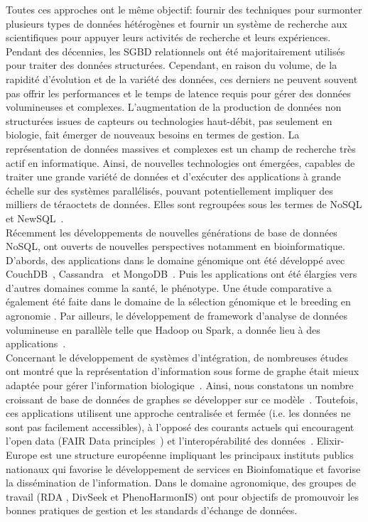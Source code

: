 Toutes ces approches ont le même objectif: fournir des techniques pour surmonter plusieurs types de données hétérogènes et fournir un système de recherche aux scientifiques pour appuyer leurs activités de recherche et leurs expériences.
Pendant des décennies, les SGBD relationnels ont été majoritairement utilisés pour traiter des données structurées. Cependant, en raison du volume, de la rapidité d'évolution et de la variété des données, ces derniers ne peuvent souvent pas offrir les performances et le temps de latence requis pour gérer des données volumineuses et complexes. L'augmentation de la production de données non structurées issues de capteurs ou technologies haut-débit, pas seulement en biologie, fait émerger de nouveaux besoins en termes de gestion. La représentation de données massives et complexes est un champ de recherche très actif en informatique. Ainsi, de nouvelles technologies ont émergées, capables de traiter une grande variété de données et d’exécuter des applications à grande échelle sur des systèmes parallélisés, pouvant potentiellement impliquer des milliers de téraoctets de données. Elles sont regroupées sous les termes de NoSQL et NewSQL~\cite{Gajendran2012, Grolinger2013,MoniruzzamanH13}.\\

Récemment les développements de nouvelles générations de base de données NoSQL, ont ouverts de nouvelles perspectives notamment en bioinformatique. D'abords, des applications dans le domaine génomique ont été développé avec CouchDB~\cite{Manyam2012,Aniceto2015}, Cassandra~\cite{Gabetta2015} et MongoDB~\cite{Sempere2016}. Puis les applications ont été élargies vers d'autres domaines comme la santé, le phénotype. Une étude comparative a également été faite dans le domaine de la sélection génomique et le breeding en agronomie \cite{benchmarking2019}. Par ailleurs, le développement de framework d'analyse de données volumineuse en parallèle telle que Hadoop ou Spark, a donnée lieu à des applications~\cite{Schumacher2014,Nordberg2013,Taylor2010}.\\

 Concernant le développement de systèmes d'intégration, de nombreuses études ont montré que la représentation d’information sous forme de graphe était mieux adaptée pour gérer l’information biologique~\cite{Have2013,Lysenko2016}.  Ainsi, nous constatons un nombre croissant de base de données de graphes se développer sur ce modèle~\cite{Hassani-Pak2016,Pareja-tobes2015}. Toutefois, ces applications utilisent une approche centralisée et fermée (i.e. les données ne sont pas facilement accessibles), à l’opposé des courants actuels qui encouragent l’open data (FAIR Data principles~\cite{Wilkinson2016a}) et l’interopérabilité des données~\cite{DzaleYeumo2017,Leonelli2017}. Elixir-Europe est une structure européenne impliquant les principaux instituts publics nationaux qui favorise le développement de services en Bioinfomatique et favorise la dissémination de l’information. Dans le domaine agronomique, des groupes de travail (RDA , DivSeek et PhenoHarmonIS) ont pour objectifs de promouvoir les bonnes pratiques de gestion et les standards d’échange de données.\\

